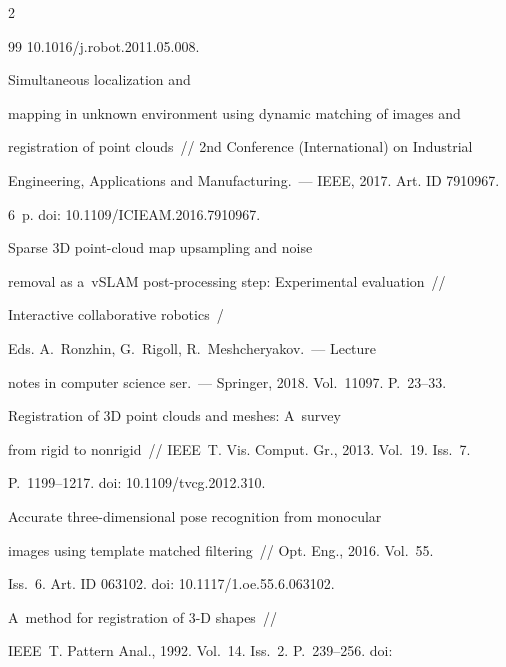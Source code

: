 \begin{multicols}{2}
{{\begin{thebibliography}{99}
10.1016/j.robot.2011.05.008.


 Simultaneous localization and 

mapping in unknown environment using dynamic matching of images and 

registration of point clouds~// 2nd Conference (\mbox{International}) on Industrial 

Engineering, Applications and Manufacturing.~--- IEEE, 2017. Art. ID 7910967. 

6~p. doi: 10.1109/ICIEAM.2016.7910967.


 Sparse 3D point-cloud map upsampling and noise 

removal as a~vSLAM post-processing step: Experimental evaluation~// 

Interactive collaborative robotics~/ 

Eds. A.~Ronzhin, G.~Rigoll, R.~Meshcheryakov.~--- Lecture 

notes in computer science ser.~--- Springer, 2018. Vol.~11097. P.~23--33.




 Registration of 3D point clouds and meshes: A~survey 

from rigid to nonrigid~// IEEE~T. Vis. Comput. Gr., 2013. Vol.~19. Iss.~7. 

P.~1199--1217. doi: 10.1109/tvcg.2012.310.




 Accurate three-dimensional pose recognition from monocular 

images using template matched filtering~// Opt. Eng., 2016. Vol.~55. 

Iss.~6. Art. ID 063102. doi: 10.1117/1.oe.55.6.063102.




 A~method for registration of \mbox{3-D} shapes~// 

IEEE~T. Pattern Anal., 1992. Vol.~14. Iss.~2. P.~239--256. doi: 


\end{thebibliography}}}
\end{multicols}
